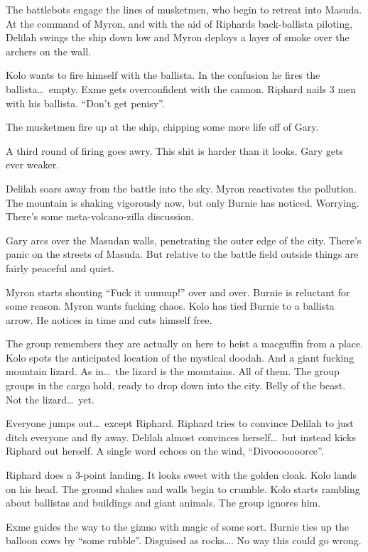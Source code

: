 The battlebots engage the lines of musketmen, who begin to retreat into Masuda. At the command of Myron, and with the aid of Riphards back-ballista piloting, Delilah swings the ship down low and Myron deploys a layer of smoke over the archers on the wall.\medskip

Kolo wants to fire himself with the ballista. In the confusion he fires the ballista\ldots\ empty. Exme gets overconfident with the cannon. Riphard nails 3 men with his ballista. ``Don't get penisy''.\medskip

The musketmen fire up at the ship, chipping some more life off of Gary.\medskip

A third round of firing goes awry. This shit is harder than it looks. Gary gets ever weaker.\medskip

Delilah soars away from the battle into the sky. Myron reactivates the pollution. The mountain is shaking vigorously now, but only Burnie has noticed. Worrying. There's some meta-volcano-zilla discussion.\medskip

Gary arcs over the Masudan walls, penetrating the outer edge of the city. There's panic on the streets of Masuda. But relative to the battle field outside things are fairly peaceful and quiet.\medskip

Myron starts shouting ``Fuck it uuuuup!'' over and over. Burnie is reluctant for some reason. Myron wants fucking chaos. Kolo has tied Burnie to a ballista arrow. He notices in time and cuts himself free.\medskip

The group remembers they are actually on here to heist a macguffin from a place. Kolo spots the anticipated location of the mystical doodah. And a giant fucking mountain lizard. As in\ldots\ the lizard is the mountains. All of them. The group groups in the cargo hold, ready to drop down into the city. Belly of the beast. Not the lizard\ldots\ yet.\medskip

Everyone jumps out\ldots\ except Riphard. Riphard tries to convince Delilah to just ditch everyone and fly away. Delilah almost convinces herself\ldots\ but instead kicks Riphard out herself. A single word echoes on the wind, ``Divooooooorce''.\medskip

Riphard does a 3-point landing. It looks sweet with the golden cloak. Kolo lands on his head. The ground shakes and walls begin to crumble. Kolo starts rambling about ballistas and buildings and giant animals. The group ignores him.\medskip

Exme guides the way to the gizmo with magic of some sort. Burnie ties up the balloon cows by ``some rubble''. Disguised as rocks\ldots. No way this could go wrong.\medskip

